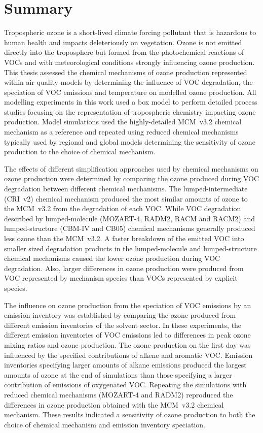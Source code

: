 \section{Summary}
Tropospheric ozone is a short-lived climate forcing pollutant that is hazardous to human health and impacts deleteriously on vegetation.
Ozone is not emitted directly into the troposphere but formed from the photochemical reactions of VOCs and  with meteorological conditions strongly influencing ozone production.
This thesis assessed the chemical mechanisms of ozone production represented within air quality models by determining the influence of VOC degradation, the speciation of VOC emissions and temperature on modelled ozone production.
All modelling experiments in this work used a box model to perform detailed process studies focusing on the representation of tropospheric chemistry impacting ozone production.
Model simulations used the highly-detailed MCM~v3.2 chemical mechanism as a reference and repeated using reduced chemical mechanisms typically used by regional and global models determining the sensitivity of ozone production to the choice of chemical mechanism.

The effects of different simplification approaches used by chemical mechanisms on ozone production were determined by comparing the ozone produced during VOC degradation between different chemical mechanisms.
The lumped-intermediate (CRI~v2) chemical mechanism produced the most similar amounts of ozone to the MCM~v3.2 from the degradation of each VOC.
While VOC degradation described by lumped-molecule (MOZART-4, RADM2, RACM and RACM2) and lumped-structure (CBM-IV and CB05) chemical mechanisms generally produced less ozone than the MCM~v3.2.
A faster breakdown of the emitted VOC into smaller sized degradation products in the lumped-molecule and lumped-structure chemical mechanisms caused the lower ozone production during VOC degradation.
Also, larger differences in ozone production were produced from VOC represented by mechanism species than VOCs represented by explicit species.

The influence on ozone production from the speciation of VOC emissions by an emission inventory was established by comparing the ozone produced from different emission inventories of the solvent sector.
In these experiments, the different emission inventories of VOC emissions led to differences in peak ozone mixing ratios and ozone production.
The ozone production on the first day was influenced by the specified contributions of alkene and aromatic VOC.
Emission inventories specifying larger amounts of alkane emissions produced the largest amounts of ozone at the end of simulations than those specifying a larger contribution of emissions of oxygenated VOC.
Repeating the simulations with reduced chemical mechanisms (MOZART-4 and RADM2) reproduced the differences in ozone production obtained with the MCM~v3.2 chemical mechanism.
These results indicated a sensitivity of ozone production to both the choice of chemical mechanism and emission inventory speciation.

